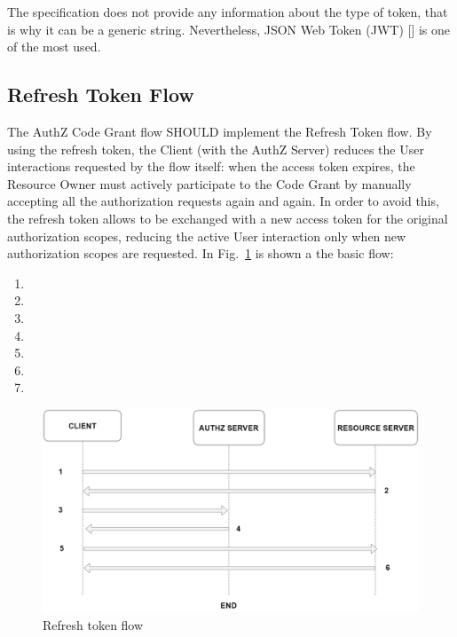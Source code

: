 The specification does not provide any information about the type of token, that is why it can be a generic string. Nevertheless, JSON Web Token (JWT) [] \cite{RFC7519} is one of the most used. 


\subsection{Refresh Token Flow}
The AuthZ Code Grant flow SHOULD implement the Refresh Token flow. By using the refresh token, the Client (with the AuthZ Server) reduces the User interactions requested by the flow itself:  when the access token expires, the Resource Owner must actively participate to the Code Grant by manually accepting all the authorization requests again and again. In order to avoid this, the refresh token allows to be exchanged with a new access token for the original authorization scopes, reducing the active User interaction only when new authorization scopes are requested. In Fig.~\ref{fig:refreshtok} is shown a the basic flow:

\begin{enumerate}
    \item 
    \item 
    \item 
    \item 
    \item 
    \item 
    \item 
\end{enumerate}

\begin{figure}
    \centering
    \includegraphics[width=\textwidth]{chapters/images/chp2/refresh_token_general.png}
    \caption{Refresh token flow}
    \label{fig:refreshtok}
\end{figure}

